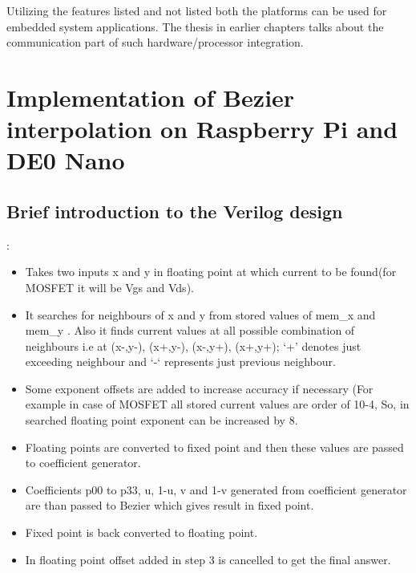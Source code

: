 Utilizing the features listed and not listed both the platforms can be used for embedded system applications. The thesis in earlier chapters talks about the communication part of such hardware/processor integration. 

\section{Implementation of Bezier interpolation on Raspberry Pi and DE0 Nano}
\subsection{Brief introduction to the Verilog design}:
\begin{itemize}
	\item{Takes two inputs x and y in floating point at which current to be found(for MOSFET it will be Vgs  and Vds).}
	\item{It searches for neighbours of x and y from stored values of mem\_x and mem\_y . Also it finds current values at all possible combination of neighbours   i.e at (x-,y-), (x+,y-), (x-,y+), (x+,y+); ‘+’ denotes just exceeding neighbour and ‘-‘ represents just previous neighbour.}
	\item{Some exponent offsets are added to increase accuracy if necessary (For example in case of MOSFET all stored current values are order of 10-4, So, in searched floating point exponent can be increased by 8.}
	\item{Floating points are converted to fixed point and then these values are passed to coefficient generator.}
	\item{Coefficients p00 to p33, u, 1-u, v and 1-v generated from coefficient generator are than passed to Bezier which gives result in fixed point.}
	\item{Fixed point is back converted to floating point.}
	\item{In floating point offset added in step 3 is cancelled to get the final answer.}
\end{itemize}
\newpage
